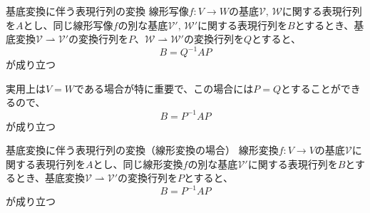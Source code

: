 \documentclass[../../../topic_linear-algebra]{subfiles}
\begin{document}
\begin{theorem}{基底変換に伴う表現行列の変換}
  線形写像$f\colon V \to W$の基底$\mathcal{V},\, \mathcal{W}$に関する表現行列を$A$とし、同じ線形写像$f$の別な基底$\mathcal{V}',\, \mathcal{W}'$に関する表現行列を$B$とするとき、基底変換$\mathcal{V} \rightharpoonup \mathcal{V}'$の変換行列を$P$、$\mathcal{W} \rightharpoonup \mathcal{W}'$の変換行列を$Q$とすると、
  \begin{equation*}
    B = Q^{-1} A P
  \end{equation*}
  が成り立つ
\end{theorem}

\sectionline

実用上は$V=W$である場合が特に重要で、この場合には$P=Q$とすることができるので、
\begin{equation*}
  B = P^{-1} A P
\end{equation*}
が成り立つ

\begin{theorem}{基底変換に伴う表現行列の変換（線形変換の場合）}\label{thm:similarity-under-basis-change}
  線形変換$f\colon V \to V$の基底$\mathcal{V}$に関する表現行列を$A$とし、同じ線形変換$f$の別な基底$\mathcal{V}'$に関する表現行列を$B$とするとき、基底変換$\mathcal{V} \rightharpoonup \mathcal{V}'$の変換行列を$P$とすると、
  \begin{equation*}
    B = P^{-1} A P
  \end{equation*}
  が成り立つ
\end{theorem}
\end{document}
